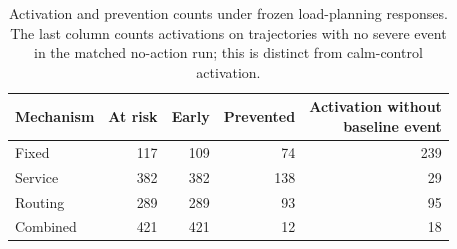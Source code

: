 \clearpage
\begin{table}[p]\caption{Activation and prevention counts under frozen load-planning responses. The last column counts activations on trajectories with no severe event in the matched no-action run; this is distinct from calm-control activation.}\centering\small\setlength{\tabcolsep}{3pt}\begin{tabular}{lrrrr}\toprule
Mechanism & At risk & Early & Prevented & \shortstack{Activation without\\baseline event}\\\midrule
Fixed & 117 & 109 & 74 & 239\\
Service & 382 & 382 & 138 & 29\\
Routing & 289 & 289 & 93 & 95\\
Combined & 421 & 421 & 12 & 18\\
\bottomrule\end{tabular}\end{table}\clearpage
